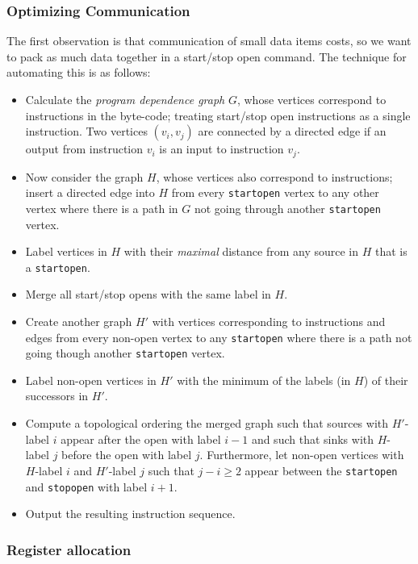 \subsubsection{Optimizing Communication}

The first observation is that communication of small data items
costs, so we want to pack as much data together in a start/stop open
command.
The technique for automating this is as follows:
\begin{itemize}
  \item Calculate the \textit{program dependence graph} $G$, whose vertices correspond to
        instructions in the byte-code;
        treating start/stop open instructions as a single instruction.
        Two vertices $(v_i,v_j)$ are connected by a directed edge if an output from
        instruction $v_i$ is an input to instruction $v_j$.
  \item Now consider the graph $H$, whose vertices also correspond to
    instructions; insert a directed edge into $H$ from every
    \verb+startopen+ vertex to any other vertex where there is a path
    in $G$ not going through another \verb+startopen+ vertex.
  \item Label vertices in $H$ with their {\em maximal} distance from
    any source in $H$ that is a \verb+startopen+.
  \item Merge all start/stop opens with the same label in $H$.
  \item Create another graph $H'$ with vertices corresponding to
    instructions and edges from every non-open vertex to any
    \verb+startopen+ where there is a path not going though another
    \verb+startopen+ vertex.
  \item Label non-open vertices in $H'$ with the minimum of the labels
    (in $H$) of their successors in $H'$.
  \item Compute a topological ordering the merged graph such that
    sources with $H'$-label $i$ appear after the open with label $i-1$
    and such that sinks with $H$-label $j$ before the open with label
    $j$. Furthermore, let non-open vertices with $H$-label $i$ and
    $H'$-label $j$ such that $j - i \ge 2$ appear between the
    \verb+startopen+ and \verb+stopopen+ with label $i+1$.
  \item Output the resulting instruction sequence.
\end{itemize}

\subsubsection{Register allocation}
\label{sec:regalloc}

